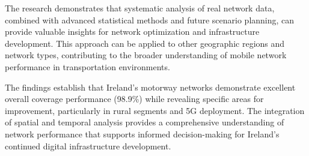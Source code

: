 \documentclass[MScCS]{uccthesis}
\begin{document}
The research demonstrates that systematic analysis of real network data, combined with advanced statistical methods and future scenario planning, can provide valuable insights for network optimization and infrastructure development. This approach can be applied to other geographic regions and network types, contributing to the broader understanding of mobile network performance in transportation environments.

The findings establish that Ireland's motorway networks demonstrate excellent overall coverage performance (98.9\%) while revealing specific areas for improvement, particularly in rural segments and 5G deployment. The integration of spatial and temporal analysis provides a comprehensive understanding of network performance that supports informed decision-making for Ireland's continued digital infrastructure development.

\backmatter
\printbibliography
\end{document}
